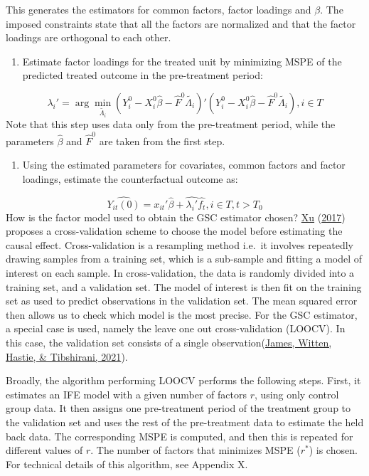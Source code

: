 \documentclass[12pt,nobind, a4paper]{reedthesis}
\providecommand{\tightlist}{%
	\setlength{\itemsep}{0pt}\setlength{\parskip}{0pt}}
\begin{document}
 This generates the estimators for common factors, factor loadings and \(\beta\). The imposed constraints state that all the factors are normalized and that the factor loadings are orthogonal to each other.
 \begin{enumerate}
 \def\labelenumi{\arabic{enumi}.}
 \setcounter{enumi}{1}
 \tightlist
 \item
   Estimate factor loadings for the treated unit by minimizing MSPE of the predicted treated outcome in the pre-treatment period:
 \end{enumerate}
 \[\lambda_{i}'=\arg\min_{\tilde{\Lambda_{i}}} (Y_{i}^{0}-X_{i}^{0} \hat{\beta}-\hat{F}^{0}\tilde{\Lambda_{i}})'(Y_{i}^{0}-X_{i}^{0} \hat{\beta}-\hat{F}^{0}\tilde{\Lambda_{i}}), i \in T\]
 Note that this step uses data only from the pre-treatment period, while the parameters \(\hat{\beta}\) and \(\hat{F}^{0}\) are taken from the first step.
 \begin{enumerate}
 \def\labelenumi{\arabic{enumi}.}
 \setcounter{enumi}{2}
 \tightlist
 \item
   Using the estimated parameters for covariates, common factors and factor loadings, estimate the counterfactual outcome as:
 \end{enumerate}
 \[\hat{Y_{it}(0)}=x_{it}'\hat{\beta}+\hat{\lambda_{i}'}\hat{f_{t}},  i\in T, t>T_{0}\]
 How is the factor model used to obtain the GSC estimator chosen? \protect\hyperlink{ref-xu_generalized_2017}{Xu} (\protect\hyperlink{ref-xu_generalized_2017}{2017}) proposes a cross-validation scheme to choose the model before estimating the causal effect. Cross-validation is a resampling method i.e.~it involves repeatedly drawing samples from a training set, which is a sub-sample and fitting a model of interest on each sample. In cross-validation, the data is randomly divided into a training set, and a validation set. The model of interest is then fit on the training set as used to predict observations in the validation set. The mean squared error then allows us to check which model is the most precise. For the GSC estimator, a special case is used, namely the leave one out cross-validation (LOOCV). In this case, the validation set consists of a single observation(\protect\hyperlink{ref-james_introduction_2021}{James, Witten, Hastie, \& Tibshirani, 2021}).
 \linebreak

 Broadly, the algorithm performing LOOCV performs the following steps. First, it estimates an IFE model with a given number of factors \(r\), using only control group data. It then assigns one pre-treatment period of the treatment group to the validation set and uses the rest of the pre-treatment data to estimate the held back data. The corresponding MSPE is computed, and then this is repeated for different values of \(r\). The number of factors that minimizes MSPE (\(r^{*}\)) is chosen. For technical details of this algorithm, see Appendix X.
 \linebreak
\end{document}
